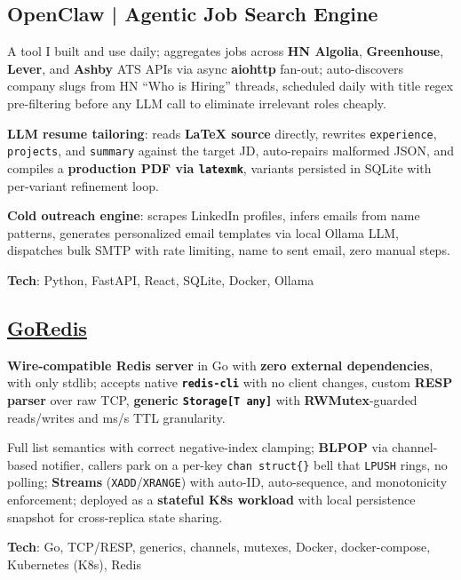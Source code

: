 \documentclass[letter,10pt]{article}
\begin{document}
\subsection{{OpenClaw | Agentic Job Search Engine}}
\begin{zitemize}
  \item A tool I built and use daily; aggregates jobs across \textbf{HN Algolia}, \textbf{Greenhouse}, \textbf{Lever}, and \textbf{Ashby} ATS APIs via async \textbf{aiohttp} fan-out; auto-discovers company slugs from HN ``Who is Hiring'' threads, scheduled daily with title regex pre-filtering before any LLM call to eliminate irrelevant roles cheaply.
  \item \textbf{LLM resume tailoring}: reads \textbf{LaTeX source} directly, rewrites \texttt{experience}, \texttt{projects}, and \texttt{summary} against the target JD, auto-repairs malformed JSON, and compiles a \textbf{production PDF via \texttt{latexmk}}, variants persisted in SQLite with per-variant refinement loop.
  \item \textbf{Cold outreach engine}: scrapes LinkedIn profiles, infers emails from name patterns, generates personalized email templates via local Ollama LLM, dispatches bulk SMTP with rate limiting, name to sent email, zero manual steps.
  \item \textbf{Tech}: Python, FastAPI, React, SQLite, Docker, Ollama
\end{zitemize}

\subsection{{\href{https://github.com/JustUzair/codecrafters-redis-go}{GoRedis}}}
\begin{zitemize}
  \item \textbf{Wire-compatible Redis server} in Go with \textbf{zero external dependencies}, with only stdlib; accepts native \textbf{\texttt{redis-cli}} with no client changes, custom \textbf{RESP parser} over raw TCP, \textbf{generic \texttt{Storage[T~any]}} with \textbf{RWMutex}-guarded reads/writes and ms/s TTL granularity.
  \item Full list semantics with correct negative-index clamping; \textbf{BLPOP} via channel-based notifier, callers park on a per-key \texttt{chan~struct\{\}} bell that \texttt{LPUSH} rings, no polling; \textbf{Streams} (\texttt{XADD}/\texttt{XRANGE}) with auto-ID, auto-sequence, and monotonicity enforcement; deployed as a \textbf{stateful K8s workload} with local persistence snapshot for cross-replica state sharing.
  \item \textbf{Tech}: Go, TCP/RESP, generics, channels, mutexes, Docker, docker-compose, Kubernetes (K8s),  Redis
\end{zitemize}
\end{document}
